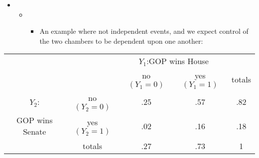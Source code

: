 \documentclass[11pt]{article}
\begin{document}
\begin{itemize}
\item 
\begin{itemize}
\item 
\begin{itemize}
\item An example where not independent events, and we expect control of the
two chambers to be dependent upon one another:
\end{itemize}
\end{itemize}
\end{itemize}

\begin{center}
\begin{tabular}{ccccc}
&  & \multicolumn{2}{c}{$Y_{1}$:GOP wins House} &  \\ 
&  & no $\left( Y_{1}=0\right) $ & yes $\left( Y_{1}=1\right) $ & totals \\ 
$Y_{2}$: & no $\left( Y_{2}=0\right) $ & .25 & .57 & .82 \\ 
GOP wins Senate & yes $\left( Y_{2}=1\right) $ & .02 & .16 & .18 \\ 
& totals & .27 & .73 & 1%
\end{tabular}
\end{center}
\end{document}

